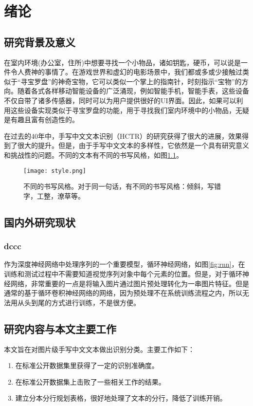\documentclass[winfonts]{njuthesis}
\begin{document}
\chapter{绪论}\label{chapter_introduction}
	\section{研究背景及意义}
		在室内环境(办公室，住所)中想要寻找一个小物品，诸如钥匙，硬币，可以说是一件令人费神的事情了\cite{HyperEarAbstract}。在游戏世界和虚幻的电影场景中，我们都或多或少接触过类似于“寻宝罗盘”的神奇宝物，它可以类似一个掌上的指南针，时刻指示“宝物”的方向。随着各式各样移动智能设备的广泛涌现，例如智能手机，智能手表，这些设备不仅自带了诸多传感器，同时可以为用户提供很好的UI界面。因此，如果可以利用这些设备实现类似于寻宝罗盘的功能，用于寻找我们室内环境中的小物品，无疑是有趣且富有创造性的。
		
		
		
		在过去的40年中\cite{sam}，手写中文文本识别（HCTR）的研究获得了很大的进展，效果得到了很大的提升\cite{fujisawa2008forty}。但是，由于手写中文文本的多样性，它依然是一个具有研究意义和挑战性的问题\cite{xu2012touching}。不同的文本有不同的书写风格，如图\ref{fig:style}。 

		\begin{figure}[htbp]
   		\centering
   		\texttt{[image: style.png]} %
   		\caption{不同的书写风格。对于同一句话，有不同的书写风格：倾斜，写错字，工整，潦草等。}
   		\label{fig:style}
		\end{figure}

	\section{国内外研究现状}
		\subsection{dccc}
		作为深度神经网络中处理序列的一个重要模型，循环神经网络，如图\ref{fig:rnn}，在训练和测试过程中不需要知道视觉序列对象中每个元素的位置。但是，对于循环神经网络，非常重要的一点是将输入图片通过图片预处理转化为一串图片特征\cite{graves2009novel,su2014accurate}。但是通常的基于循环卷积神经网络的网络，因为预处理不在系统训练流程之内，所以无法用从头到尾的方式进行训练，不是很方便。


	\section{研究内容与本文主要工作}
		本文旨在对图片级手写中文文本做出识别分类。主要工作如下：
		\begin{enumerate}
		\item 在标准公开数据集里获得了一定的识别准确度。
			
		\item 在标准公开数据集上击败了一些相关工作的结果。
			
		\item 建立分本分行规划表格，很好地处理了文本的分行，降低了训练开销。
			
		\end{enumerate}
\end{document}
